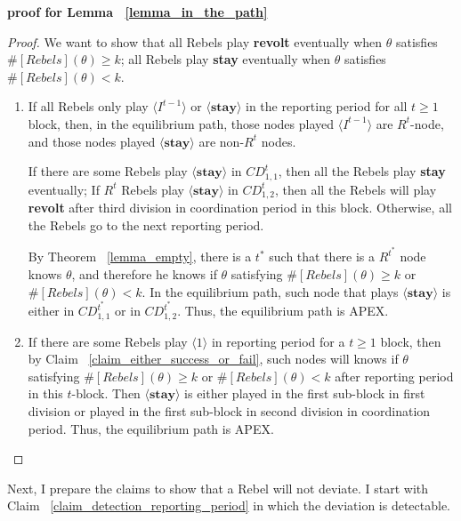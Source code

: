 \documentclass[12pt,letter]{article}
\theoremstyle{definition}
\theoremstyle{remark}
\theoremstyle{claim}
\begin{document}
\noindent \textbf{proof for Lemma ~\ref{lemma_in_the_path}}
\begin{proof}
We want to show that all Rebels play \textbf{revolt} eventually when $\theta$ satisfies $\#[Rebels](\theta)\geq k$; all Rebels play \textbf{stay} eventually when $\theta$ satisfies $\#[Rebels](\theta)< k$.
\begin{enumerate}
\item If all Rebels only play $\langle I^{t-1} \rangle$ or $\langle \textbf{stay} \rangle$ in the reporting period for all $t\geq 1$ block, then, in the equilibrium path, those nodes played $\langle I^{t-1} \rangle$ are $R^t$-node, and those nodes played $\langle \textbf{stay} \rangle$ are non-$R^t$ nodes. 

If there are some Rebels play $\langle \textbf{stay} \rangle$ in $CD^t_{1,1}$, then all the Rebels play \textbf{stay} eventually; If $R^t$ Rebels play $\langle \textbf{stay} \rangle$ in $CD^t_{1,2}$, then all the Rebels will play \textbf{revolt} after third division in coordination period in this block. Otherwise, all the Rebels go to the next reporting period.

By Theorem ~\ref{lemma_empty}, there is a $t^{*}$ such that there is a $R^{t^{*}}$ node knows $\theta$, and therefore he knows if $\theta$ satisfying $\#[Rebels](\theta)\geq k$ or $\#[Rebels](\theta)< k$. In the equilibrium path, such node that plays $\langle \textbf{stay} \rangle$ is either in $CD^{t^{*}}_{1,1}$ or in $CD^{t^{*}}_{1,2}$. Thus, the equilibrium path is APEX.

\item If there are some Rebels play $\langle 1 \rangle$ in reporting period for a $t\geq 1$ block, then by Claim ~\ref{claim_either_success_or_fail}, such nodes will knows if $\theta$ satisfying $\#[Rebels](\theta)\geq k$ or $\#[Rebels](\theta)< k$ after reporting period in this $t$-block. Then $\langle \textbf{stay} \rangle$ is either played in the first sub-block in first division or played in the first sub-block in second division in coordination period. Thus, the equilibrium path is APEX.

 
\end{enumerate}

\end{proof}



Next, I prepare the claims to show that a Rebel will not deviate. I start with Claim ~\ref{claim_detection_reporting_period} in which the deviation is detectable.
\end{document}
